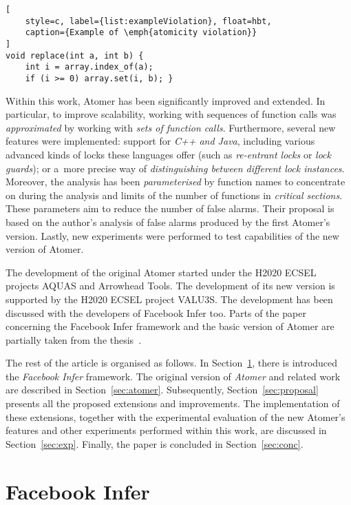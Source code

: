 \documentclass{ExcelAtFIT}
\theoremstyle{example}
\begin{document}
\begin{lstlisting}[
    style=c, label={list:exampleViolation}, float=hbt,
    caption={Example of \emph{atomicity violation}}
]
void replace(int a, int b) {
    int i = array.index_of(a);
    if (i >= 0) array.set(i, b); }
\end{lstlisting}

Within this work, Atomer has been significantly improved and extended. In particular, to improve scalability, working with sequences of function calls was \emph{approximated} by working with \emph{sets of function calls}. Furthermore, several new features were implemented: support for \emph{C++ and Java}, including various advanced kinds of locks these languages offer (such as \emph{re-entrant locks} or \emph{lock guards}); or a~more precise way of \emph{distinguishing between different lock instances}. Moreover, the analysis has been \emph{parameterised} by function names to concentrate on during the analysis and limits of the number of functions in \emph{critical sections}. These parameters aim to reduce the number of false alarms. Their proposal is based on the author's analysis of false alarms produced by the first Atomer's version. Lastly, new experiments were performed to test capabilities of the new version of Atomer.

The development of the original Atomer started under the H2020 ECSEL projects AQUAS and Arrowhead Tools. The development of its new version is supported by the H2020 ECSEL project VALU3S. The development has been discussed with the developers of Facebook Infer too. Parts of the paper concerning the Facebook Infer framework and the basic version of Atomer are partially taken from the thesis~\cite{harmimBP}.

The rest of the article is organised as follows. In Section~\ref{sec:infer}, there is introduced the \emph{Facebook Infer} framework. The original version of \emph{Atomer} and related work are described in Section~\ref{sec:atomer}. Subsequently, Section~\ref{sec:proposal} presents all the proposed extensions and improvements. The implementation of these extensions, together with the experimental evaluation of the new Atomer's features and other experiments performed within this work, are discussed in Section~\ref{sec:exp}. Finally, the paper is concluded in Section~\ref{sec:conc}.


\section{Facebook Infer}
\label{sec:infer}
\end{document}

